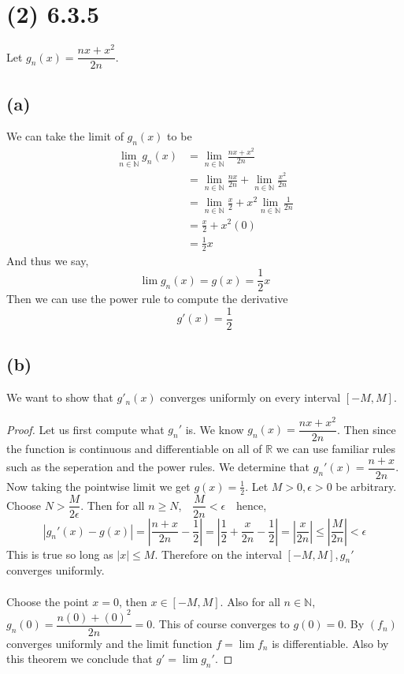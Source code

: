 \documentclass{article}
\begin{document}
\section*{(2) 6.3.5}
Let $g_n(x) = \dfrac{nx+x^2}{2n}$.
\subsection*{(a)}
We can take the limit of $g_n(x)$ to be 
\begin{align*}
    \lim_{n \in \mathbb{N}} g_n(x) & = \lim_{n \in \mathbb{N}} \frac{nx + x^2}{2n} \\
    & = \lim_{n \in \mathbb{N}} \frac{nx}{2n} + \lim_{n \in \mathbb{N}}\frac{x^2}{2n} \\
    & = \lim_{n \in \mathbb{N}}\frac{x}{2} + x^2\lim_{n \in \mathbb{N}}\frac{1}{2n}\\
    & = \frac{x}{2} + x^2 (0) \\
    & = \frac{1}{2} x
\end{align*} 
And thus we say,
\[\lim g_n(x) =  g(x) = \frac{1}{2}x \]
Then we can use the power rule to compute the derivative
\[ g'(x) = \frac{1}{2}\]
\subsection*{(b)}
We want to show that $g'_n(x)$ converges uniformly on every interval $[-M, M]$.
\begin{proof}
    Let us first compute what $g_n'$ is.
    We know $g_n(x) = \dfrac{nx+x^2}{2n}$.
    Then since the function is continuous and differentiable on all of $\mathbb{R}$ we can use familiar rules such as the seperation and the power rules.
    We determine that $g_n'(x) = \dfrac{n + x}{2n}$.
    Now taking the pointwise limit we get $g(x) = \frac{1}{2}$.
    Let $M > 0, \epsilon > 0$ be arbitrary.
    Choose $N > \dfrac{M}{2\epsilon}$.
    Then for all $n \geqslant N$,    $ \ \ \ \dfrac{M}{2n} < \epsilon \ \ \ $ hence,
    \[ \left|g_n'(x) - g(x)\right|=\left|\frac{n+x}{2n} - \frac{1}{2}\right| = \left|\frac{1}{2} + \frac{x}{2n} - \frac{1}{2}\right| = \left|\frac{x}{2n}\right| \leqslant \left|\frac{M}{2n}\right| < \epsilon \]
    This is true so long as $|x| \leqslant M$. Therefore on the interval $[-M,M], g_n'$ converges uniformly.
    \\\\
    Choose the point $x = 0$, then $x \in [-M, M]$.
    Also for all $n \in \mathbb{N}$, $g_n(0) = \dfrac{n(0) + (0)^2}{2n} = 0$.
    This of course converges to $g(0) = 0$.
    By  $(f_n)$ converges uniformly and the limit function $f = \lim f_n$ is differentiable.
    Also by this theorem we conclude that $g' = \lim g_n'$.
\end{proof}
\end{document}
